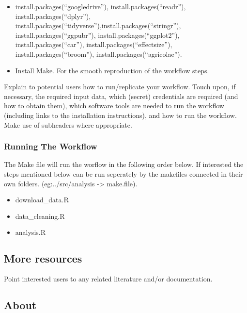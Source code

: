 \documentclass[
]{article}
\providecommand{\tightlist}{%
  \setlength{\itemsep}{0pt}\setlength{\parskip}{0pt}}
\begin{document}
\begin{itemize}
\item
  install.packages(``googledrive''), install.packages(``readr''),
  install.packages(``dplyr''),
  install.packages(``tidyverse''),install.packages(``stringr''),
  install.packages(``ggpubr''), install.packages(``ggplot2''),
  install.packages(``car''), install.packages(``effectsize''),
  install.packages(``broom''), install.packages(``agricolae'').
\item
  Install Make. For the smooth reproduction of the workflow steps.
\end{itemize}

Explain to potential users how to run/replicate your workflow. Touch
upon, if necessary, the required input data, which (secret) credentials
are required (and how to obtain them), which software tools are needed
to run the workflow (including links to the installation instructions),
and how to run the workflow. Make use of subheaders where appropriate.

\hypertarget{running-the-workflow}{%
\subsubsection{Running The Workflow}\label{running-the-workflow}}

The Make file will run the worflow in the following order below. If
interested the steps mentioned below can be run seperately by the
makefiles connected in their own folders. (eg:../src/analysis
-\textgreater{} make.file).

\begin{itemize}
\tightlist
\item
  download\_data.R
\item
  data\_cleaning.R
\item
  analysis.R
\end{itemize}

\hypertarget{more-resources}{%
\subsection{More resources}\label{more-resources}}

Point interested users to any related literature and/or documentation.

\hypertarget{about}{%
\subsection{About}\label{about}}
\end{document}
